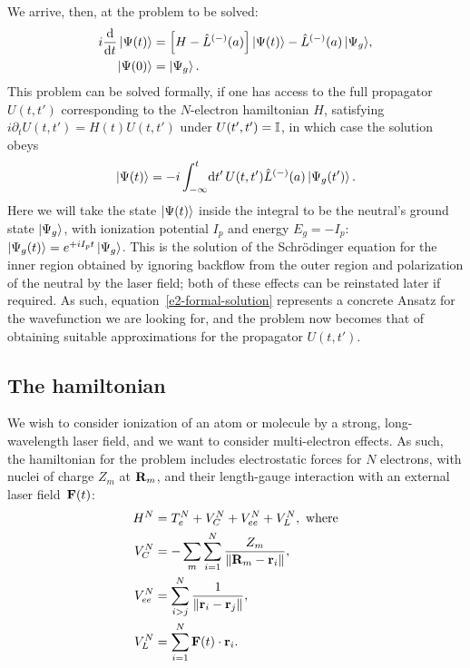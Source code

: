 We arrive, then, at the problem to be solved:
\begin{subequations}
\label{e2-problem}
\begin{align}
i\frac{\mathrm{d}}{\mathrm{d} t}\ket{\Psi(t)}
&=\left[H - \hat{L}^{(-)}(a)\right]\ket{\Psi(t)} -\hat{L}^{(-)}(a)\ket{\Psi_g}\!,
\\
\ket{\Psi(0)}&=\ket{\Psi_g}.
\end{align}
\end{subequations}
This problem can be solved formally, if one has access to the full propagator $U(t,t')$ corresponding to the $N$-electron hamiltonian $H$, satisfying $i\partial_t U(t,t') = H(t) U(t,t')$ under $U(t',t')=\mathbb{I}$, in which case the solution obeys
\begin{equation}
\ket{\Psi(t)}=-i\int_{-\infty}^t \!\mathrm{d} t' \, U(t,t')\hat{L}^{(-)}(a)\ket{\Psi_g(t')}.
\label{e2-formal-solution}
\end{equation}
Here we will take the state $\ket{\Psi(t)}$ inside the integral to be the neutral's ground state $\ket{\Psi_g}$, with ionization potential $I_p$ and energy $E_g=-I_p$: $\ket{\Psi_g(t)}= e^{+iI_p t}\ket{\Psi_g}$. This is the solution of the Schrödinger equation for the inner region obtained by ignoring backflow from the outer region and polarization of the neutral by the laser field; both of these effects can be reinstated later if required. As such, equation~\eqref{e2-formal-solution} represents a concrete Ansatz for the wavefunction we are looking for, and the problem now becomes that of obtaining suitable approximations for the propagator $U(t,t')$.




\subsection{The hamiltonian}
We wish to consider ionization of an atom or molecule by a strong, long-wavelength laser field, and we want to consider multi-electron effects. As such, the hamiltonian for the problem includes electrostatic forces for $N$ electrons, with nuclei of charge $Z_m$ at $\vb R_m$, and their length-gauge interaction with an external laser field~$\vb F(t)$:
\begin{subequations}
\label{e2-totalhamiltonian}
\begin{align}
H^N&=T_e^N+V_C^N+V_{ee}^N+V_L^N,\textrm{ where}\\
V_C^N&=-\sum_m \sum_{i=1}^N \frac{Z_m}{\|\vb{R}_m-\vb{r}_i\|},\\
V_{ee}^N&=\sum_{i>j}^N \frac{1}{\|\vb{r}_i-\vb{r}_j\|},\label{e2-V-ee-definition}\\
V_L^N&=\sum_{i=1}^N \vb{F}(t)\cdot \vb{r}_i.
\end{align}
\end{subequations}

